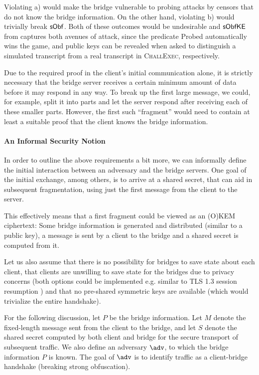 Violating a) would make the bridge vulnerable to probing attacks by censors that do not know the bridge information. On the other hand, violating b) would trivially break $\mathsf{sObf}$. Both of these outcomes would be undesirable and $\mathsf{sObfKE}$ from \cite{CCS:GunSteVei24} captures both avenues of attack, since the predicate \textsf{Probed} automatically wins the game, and public keys can be revealed when asked to distinguish a simulated transcript from a real transcript in \textsc{ChallExec}, respectively.

Due to the required proof in the client's initial communication alone, it is strictly necessary that the bridge server receives a certain minimum amount of data before it may respond in any way.
To break up the first large \drivel{} message, we could, for example, split it into parts and let the server respond after receiving each of these smaller parts. However, the first such ``fragment'' would need to contain at least a suitable proof that the client knows the bridge information.

\paragraph{An Informal Security Notion}
In order to outline the above requirements a bit more, we can informally define the initial interaction between an adversary and the bridge servers. One goal of the initial exchange, among others, is to arrive at a shared secret, that can aid in subsequent fragmentation, using just the first message from the client to the server.

This effectively means that a first fragment could be viewed as an (O)KEM ciphertext: Some bridge information is generated and distributed (similar to a public key), a message is sent by a client to the bridge and a shared secret is computed from it.

Let us also assume that there is no possibility for bridges to save state about each client, that clients are unwilling to save state for the bridges due to privacy concerns (both options could be implemented e.g. similar to TLS 1.3 session resumption \cite[Section~2.2]{rfc8446}) and that no pre-shared symmetric keys are available (which would trivialize the entire handshake).

For the following discussion, let $P$ be the bridge information.
Let $M$ denote the fixed-length message sent from the client to the bridge, and let $S$ denote the shared secret computed by both client and bridge for the secure transport of subsequent traffic.
We also define an adversary $\adv$, to which the bridge information $P$ is known.
The goal of $\adv$ is to identify traffic as a client-bridge handshake (breaking strong obfuscation).

